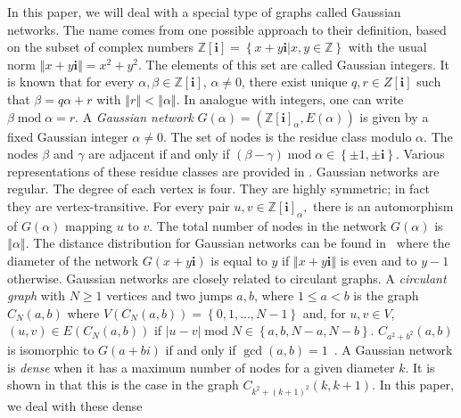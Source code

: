 \documentclass[12pt,journal,compsoc,onecolumn,]{IEEEtran}
\begin{document}
{In this paper, we will deal with a special type of graphs called Gaussian networks. The
name comes from one possible approach to their definition, based on the subset
of complex numbers $\mathbb{Z}\left[  \mathbf{i}\right]  =\left\{
x+y\mathbf{i}|x,y\in\mathbb{Z}\right\}  $ with the usual norm $\left\Vert
x+y\mathbf{i}\right\Vert =x^{2}+y^{2}$. The elements of this set are called
Gaussian integers. It is known that for every $\alpha,\beta\in\mathbb{Z}\left[  \mathbf{i}\right]  $, $\alpha\neq0$, there exist unique $q,r\in
Z[\mathbf{i}]$ such that $\beta=q\alpha+r$ with $\left\Vert r\right\Vert
<\left\Vert \alpha\right\Vert $. In analogue with integers, one can write
$\beta\operatorname{mod}\alpha=r$.  A \textsl{Gaussian network}
$G\left(  \alpha\right)  =\left(  \mathbb{Z}\left[  \mathbf{i}\right]
_{\alpha},E\left(  \alpha\right)  \right)  $ is given by a fixed Gaussian
integer $\alpha\neq0$. The set of nodes is the residue class modulo $\alpha$.
The nodes $\beta$ and $\gamma$ are adjacent if and only if $(\beta
-\gamma)\operatorname{mod}\alpha\in\left\{  \pm1,\pm\mathbf{i}\right\}  $.
Various representations of these residue classes are provided in \cite{JordanPotratz}.
Gaussian networks are regular. The degree of each vertex is four. They are
highly symmetric; in fact they are vertex-transitive.
For every pair $u,v\in\mathbb{Z}\left[  \mathbf{i}\right]
_{\alpha},$ there is an automorphism of $G\left(  \alpha\right)  $ mapping
$u$ to $v$. The total number of nodes in the network $G\left(  \alpha\right)
$ is $\left\Vert \alpha\right\Vert $. The distance distribution for Gaussian
networks can be found in~\cite{10.1109/TC.2008.57} where the diameter of the
network $G\left(  x+y\mathbf{i}\right)  $ is equal to $y$ if $\left\Vert
x+y\mathbf{i}\right\Vert $ is even and to $y-1$ otherwise. Gaussian networks are
closely related to circulant graphs. A \textsl{circulant graph} with $N\geq 1$
vertices and two jumps $a,b$, where $1\leq a<b$ is the graph
$C_{N}\left(  a,b\right)$ where $V(C_N(a,b))=\left\{
0,1,\ldots,N-1\right\}  $ and, for $u,v\in V$, $\left(  u,v\right)  \in E(C_N(a,b))$ if
$\left\vert u-v\right\vert \operatorname{mod}N\in\left\{a,b,N-a,N-b\right\}$.
$C_{a^{2}+b^{2}}\left(  a,b\right)  $ is isomorphic to $G(a+bi)$ if and
only if $\gcd\left(  a,b\right)  =1$~\cite{10.1109/TC.2008.57}. A Gaussian
network is \textsl{dense} when it has a maximum number of nodes for a given
diameter $k$. It is shown in \cite{Beivide:1991:ODN:123467.123483} that this
is the case in the graph $C_{k^{2}+\left(  k+1\right)  ^{2}}\left(
k,k+1\right)  $. In this paper, we deal with these dense
}
\end{document}
